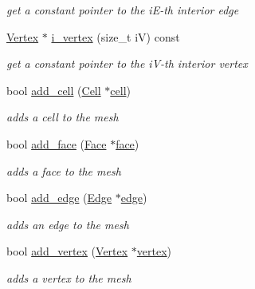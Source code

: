 \begin{DoxyCompactItemize}
\begin{DoxyCompactList}\small\item\em get a constant pointer to the i\+E-\/th interior edge \end{DoxyCompactList}\item 
\mbox{\label{classHArDCore3D_1_1Mesh_a58578f5f723f5e589ba498f74ddcbf08}} 
\hyperlink{classHArDCore3D_1_1Vertex}{Vertex} $\ast$ \hyperlink{classHArDCore3D_1_1Mesh_a58578f5f723f5e589ba498f74ddcbf08}{i\+\_\+vertex} (size\+\_\+t iV) const
\begin{DoxyCompactList}\small\item\em get a constant pointer to the i\+V-\/th interior vertex \end{DoxyCompactList}\item 
bool \hyperlink{group__Mesh_gab58e51275f4fd83e36fdf8aba6ee846d}{add\+\_\+cell} (\hyperlink{classHArDCore3D_1_1Cell}{Cell} $\ast$\hyperlink{classHArDCore3D_1_1Mesh_ae07b938c57cf57e3bb9c76d3df1eb549}{cell})
\begin{DoxyCompactList}\small\item\em adds a cell to the mesh \end{DoxyCompactList}\item 
bool \hyperlink{group__Mesh_ga37af87e0b0fbb14363b2af7106231d1e}{add\+\_\+face} (\hyperlink{classHArDCore3D_1_1Face}{Face} $\ast$\hyperlink{classHArDCore3D_1_1Mesh_a09d8a0ee1f515991b06a3517e33a894e}{face})
\begin{DoxyCompactList}\small\item\em adds a face to the mesh \end{DoxyCompactList}\item 
bool \hyperlink{group__Mesh_gae006746b7f6bf52b3172716f4365fa5b}{add\+\_\+edge} (\hyperlink{classHArDCore3D_1_1Edge}{Edge} $\ast$\hyperlink{classHArDCore3D_1_1Mesh_acad7cdf3d2c00fa6fc23ff77c63c7d1a}{edge})
\begin{DoxyCompactList}\small\item\em adds an edge to the mesh \end{DoxyCompactList}\item 
bool \hyperlink{group__Mesh_gafe8cbdafd0716faad0283e281ca15711}{add\+\_\+vertex} (\hyperlink{classHArDCore3D_1_1Vertex}{Vertex} $\ast$\hyperlink{classHArDCore3D_1_1Mesh_ad099224c697c05a57fad6a47fdcd9e76}{vertex})
\begin{DoxyCompactList}\small\item\em adds a vertex to the mesh \end{DoxyCompactList}\item 

\end{DoxyCompactItemize}
